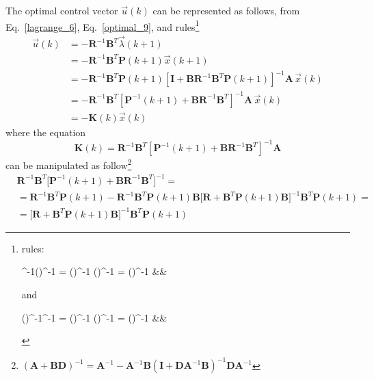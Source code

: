 \documentclass[11pt,a4paper,oneside]{book}
\numberwithin{equation}{section}
\theoremstyle{it}
\theoremstyle{definition}
\begin{document}
The optimal control vector $\vec{u}(k)$ can be represented as follows, from Eq.~\eqref{lagrange_6}, Eq.~\eqref{optimal_9}, and rules\footnote{rules:
	\begin{flalign}\label{equivalence_1}
		^{-1}\big(\big)^{-1} = \big(\big)^{-1} \quad {} \quad {}\big(\big)^{-1} = \big(\big)^{-1} &&
	\end{flalign}
	and
	\begin{flalign}\label{equivalence_2}
		\big(\big)^{-1}^{-1} = \big(\big)^{-1} \quad {} \quad \big(\big)^{-1} = \big(\big)^{-1} &&
	\end{flalign}
}
\begin{equation}\label{optimal_13}
	\begin{aligned}
		\vec{u}(k) &= -\mathbf{R}^{-1}\mathbf{B}^T\vec{\lambda}(k+1) \\[6pt]
		&=-\mathbf{R}^{-1}\mathbf{B}^T\mathbf{P}(k+1)\vec{x}(k+1)\\[6pt]
		&=-\mathbf{R}^{-1}\mathbf{B}^T\mathbf{P}(k+1)\left[\mathbf{I}+ 
		\mathbf{B}\mathbf{R}^{-1}\mathbf{B}^T\mathbf{P}(k+1)\right]^{-1}\mathbf{A}\,\vec{x}(k)
		\\[6pt]
		&= 
		-\mathbf{R}^{-1}\mathbf{B}^T\left[\mathbf{P}^{-1}(k+1)+\mathbf{B}\mathbf{R}^{-1}\mathbf{B}^T
		\right]^{-1}\mathbf{A}\,\vec{x}(k)\\[6pt]
		&=-\mathbf{K}(k)\vec{x}(k) 
	\end{aligned}
\end{equation}
where the equation
\begin{equation}\label{optimal_14}
	\mathbf{K}(k)= 
	\mathbf{R}^{-1}\mathbf{B}^T\left[\mathbf{P}^{-1}(k+1)+\mathbf{B}\mathbf{R}^{-1}\mathbf{B}^T
	\right]^{-1}\mathbf{A}
\end{equation}
can be manipulated as follow\footnote{$(\mathbf{A}+\mathbf{BD})^{-1} = 
	\mathbf{A}^{-1}-\mathbf{A}^{-1}\mathbf{B}(\mathbf{I}+\mathbf{D}\mathbf{A}^{-1}\mathbf{B})^{-1}\mathbf{D}\mathbf{A}^{-1}$}
\begin{equation}\label{optimal_15}
	\begin{aligned}
		&\mathbf{R}^{-1}\mathbf{B}^T\Big[\mathbf{P}^{-1}(k+1)+\mathbf{B}\mathbf{R}^{-1}\mathbf{B}^T
		\Big]^{-1} = \\[6pt]
		&=\mathbf{R}^{-1}\mathbf{B}^T\mathbf{P}(k+1) - 
		\mathbf{R}^{-1}\mathbf{B}^T\mathbf{P}(k+1)\mathbf{B}\Big[ 
		\mathbf{R}+\mathbf{B}^T\mathbf{P}(k+1)\mathbf{B}\Big]^{-1}\mathbf{B}^T\mathbf{P}(k+1)=
		\\[6pt]
		&=\Big[ 
		\mathbf{R}+\mathbf{B}^T\mathbf{P}(k+1)\mathbf{B}\Big]^{-1}\mathbf{B}^T\mathbf{P}(k+1)
	\end{aligned}
\end{equation}
\end{document}
